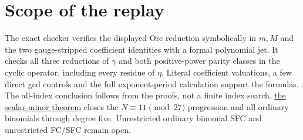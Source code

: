 \documentclass[11pt]{article}
\begin{document}
\section{Scope of the replay}
The exact checker verifies the displayed Ore reduction symbolically
in $m,M$ and the two gauge-stripped coefficient identities with a
formal polynomial jet. It checks all three reductions of $\gamma$
and both positive-power parity classes in the cyclic operator,
including every residue of $\eta$.
Literal coefficient valuations, a few direct gcd controls and
the full exponent-period calculation support the formulas.
The all-index conclusion follows from the proofs, not a finite
index search. \href{QUINTIC_SCALAR_MINOR_SFC.tex}{the scalar-minor theorem} closes the $N\equiv11\pmod{27}$ progression
and all ordinary binomials through degree five. Unrestricted ordinary
binomial SFC and unrestricted FC/SFC remain open.
\end{document}
